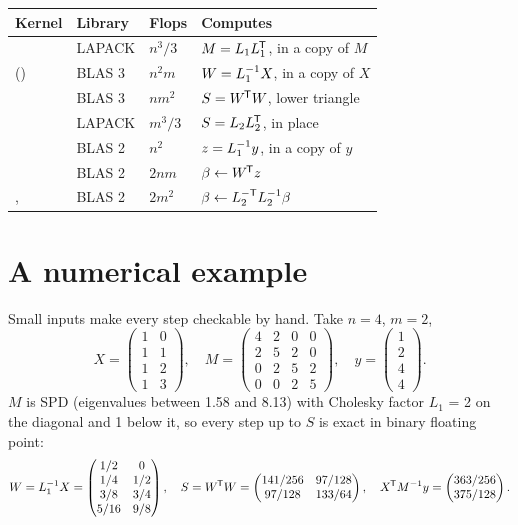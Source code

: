 \begin{center}\small
\begin{tabularx}{\linewidth}{@{}lllL@{}}
\toprule
\textbf{Kernel} & \textbf{Library} & \textbf{Flops} & \textbf{Computes} \\
\midrule
{} & LAPACK & \(n^3/3\) & \(M = L_1 L_1^{\mkern-1.5mu\mathsf{T}}\), in a copy of \(M\) \\
 () & BLAS 3 & \(n^2 m\) & \(W = L_1^{-1} X\), in a copy of \(X\) \\
 & BLAS 3 & \(n m^2\) & \(S = W^{\mkern-1.5mu\mathsf{T}} W\), lower triangle \\
 & LAPACK & \(m^3/3\) & \(S = L_2 L_2^{\mkern-1.5mu\mathsf{T}}\), in place \\
 & BLAS 2 & \(n^2\) & \(z = L_1^{-1} y\), in a copy of \(y\) \\
 & BLAS 2 & \(2nm\) & \(\beta \leftarrow W^{\mkern-1.5mu\mathsf{T}} z\) \\
,  & BLAS 2 & \(2m^2\) & \(\beta \leftarrow L_2^{-\mathsf{T}} L_2^{-1} \beta\) \\
\bottomrule
\end{tabularx}
\end{center}

\section{A numerical example}
\label{sec:gls-numbers}

Small inputs make every step checkable by hand. Take \(n=4\), \(m=2\),
\[
X=\begin{pmatrix}1&0\\1&1\\1&2\\1&3\end{pmatrix},\quad
M=\begin{pmatrix}4&2&0&0\\2&5&2&0\\0&2&5&2\\0&0&2&5\end{pmatrix},\quad
y=\begin{pmatrix}1\\2\\4\\4\end{pmatrix}.
\]
\(M\) is SPD (eigenvalues between 1.58 and 8.13) with Cholesky factor
\(L_1\) = 2 on the diagonal and 1 below it, so every step up to \(S\) is
exact in binary floating point:
\[
W = L_1^{-1} X = \begin{pmatrix}1/2&0\\1/4&1/2\\3/8&3/4\\5/16&9/8\end{pmatrix},\quad
S = W^{\mkern-1.5mu\mathsf{T}} W = \begin{pmatrix}141/256 & 97/128\\ 97/128 & 133/64\end{pmatrix},\quad
X^{\mkern-1.5mu\mathsf{T}} M^{-1} y = \begin{pmatrix}363/256\\375/128\end{pmatrix}.
\]

